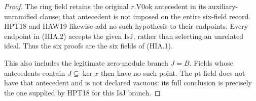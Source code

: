 \documentclass[11pt,a4paper]{article}
\numberwithin{equation}{section}
\theoremstyle{remark}\newtheorem{remark}[theorem]{Remark}
\begin{document}
\begin{proof}
The ring field retains the original \(r.\mathrm{V0ok}\)
antecedent in its auxiliary-unramified clause; that antecedent
is not imposed on the entire six-field record.  HPT18 and
HAW19 likewise add no such hypothesis to their endpoints.
Every endpoint in (HIA.2) accepts the given
\(\mathrm{IsJ}\), rather than selecting an unrelated ideal.
Thus the six proofs are the six fields of (HIA.1).

This also includes the legitimate zero-module branch
\(J=B\).  Fields whose antecedents contain
\(J\subseteq\ker x\) then have no such point.  The
\(\mathrm{pt}\) field does not have that antecedent and is
not declared vacuous: its full conclusion is precisely the
one supplied by HPT18 for this \(\mathrm{IsJ}\) branch.
\end{proof}

\end{document}
